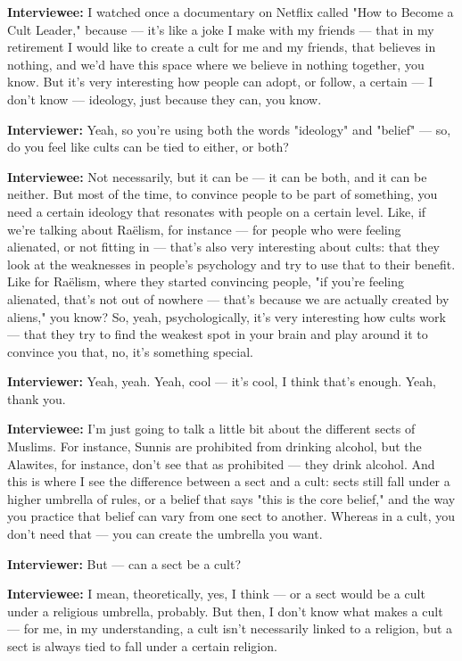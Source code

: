 \textbf{Interviewee:} I watched once a documentary on Netflix called "How to Become a Cult Leader," because — it's like a joke I make with my friends — that in my retirement I would like to create a cult for me and my friends, that believes in nothing, and we'd have this space where we believe in nothing together, you know. But it's very interesting how people can adopt, or follow, a certain — I don't know — ideology, just because they can, you know.

\textbf{Interviewer:} Yeah, so you're using both the words "ideology" and "belief" — so, do you feel like cults can be tied to either, or both?

\textbf{Interviewee:} Not necessarily, but it can be — it can be both, and it can be neither. But most of the time, to convince people to be part of something, you need a certain ideology that resonates with people on a certain level. Like, if we're talking about Raëlism, for instance — for people who were feeling alienated, or not fitting in — that's also very interesting about cults: that they look at the weaknesses in people's psychology and try to use that to their benefit. Like for Raëlism, where they started convincing people, "if you're feeling alienated, that's not out of nowhere — that's because we are actually created by aliens," you know? So, yeah, psychologically, it's very interesting how cults work — that they try to find the weakest spot in your brain and play around it to convince you that, no, it's something special.

\textbf{Interviewer:} Yeah, yeah. Yeah, cool — it's cool, I think that's enough. Yeah, thank you.

\textbf{Interviewee:} I'm just going to talk a little bit about the different sects of Muslims. For instance, Sunnis are prohibited from drinking alcohol, but the Alawites, for instance, don't see that as prohibited — they drink alcohol. And this is where I see the difference between a sect and a cult: sects still fall under a higher umbrella of rules, or a belief that says "this is the core belief," and the way you practice that belief can vary from one sect to another. Whereas in a cult, you don't need that — you can create the umbrella you want.

\textbf{Interviewer:} But — can a sect be a cult?

\textbf{Interviewee:} I mean, theoretically, yes, I think — or a sect would be a cult under a religious umbrella, probably. But then, I don't know what makes a cult — for me, in my understanding, a cult isn't necessarily linked to a religion, but a sect is always tied to fall under a certain religion.

